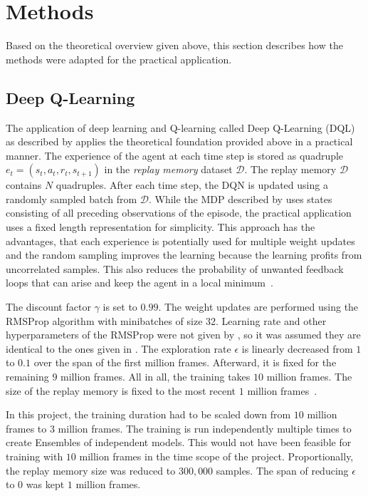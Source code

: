 \chapter{Methods}

Based on the theoretical overview given above, this section describes how the methods were adapted for the practical application.

\section{Deep Q-Learning}

The application of deep learning and Q-learning called Deep Q-Learning (DQL) as described by \textcite{mnih_playing_2013} applies the theoretical foundation provided above in a practical manner. The experience of the agent at each time step is stored as quadruple $e_{t} = (s_{t}, a_{t}, r_{t}, s_{t+1})$ in the \emph{replay memory} dataset $\mathcal D$. The replay memory $\mathcal D$ contains $N$ quadruples. After each time step, the DQN is updated using a randomly sampled batch from $\mathcal D$. While the MDP described by \textcite{mnih_playing_2013} uses states consisting of all preceding observations of the episode, the practical application uses a fixed length representation for simplicity. This approach has the advantages, that each experience is potentially used for multiple weight updates and the random sampling improves the learning because the learning profits from uncorrelated samples. This  also reduces the probability of unwanted feedback loops that can arise and keep the agent in a local minimum~\parencite{mnih_playing_2013}.

The discount factor $\gamma$  is set to $0.99$. The weight updates are performed using the RMSProp algorithm with minibatches of size 32. Learning rate and other hyperparameters of the RMSProp were not given by \textcite{mnih_playing_2013}, so it was assumed they are identical to the ones given in \textcite{mnih_human-level_2015}. The exploration rate $\epsilon$ is linearly decreased from $1$ to $0.1$ over the span of the first million frames. Afterward, it is fixed for the remaining $9$ million frames. All in all, the training takes $10$ million frames. The size of the replay memory is fixed to the most recent $1$ million frames~\parencite{mnih_playing_2013}.

In this project, the training duration had to be scaled down from $10$ million frames to $3$ million frames. The training is run independently multiple times to create Ensembles of independent models. This would not have been feasible for training with $10$ million frames in the time scope of the project. Proportionally, the replay memory size was  reduced to $300,000$ samples. The span of reducing $\epsilon$ to $0$ was kept $1$ million frames.

